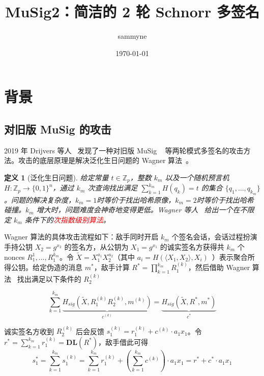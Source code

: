 \documentclass[a4paper,10pt]{article}
\title{MuSig2：简洁的 2 轮 Schnorr 多签名}
\author{sammyne}
\date{\today}
\newcommand{\bZ}{\mathbb{Z}}
\newtheorem{definition}{\bf 定义}[section]
\begin{document}
\maketitle

\section{背景}

\subsection{对旧版 MuSig 的攻击}
2019 年 Drijvers 等人~\cite{2019On} 发现了一种对旧版 MuSig ~\cite{cryptoeprint:2018:068:20180118:124757} 等两轮模式多签名的攻击方法。攻击的底层原理是解决泛化生日问题的 Wagner 算法~\cite{wagner2002generalized}。

\begin{definition}[泛化生日问题]
  给定常量 \(t\in \bZ_p\)，整数 \(k_m\) 以及一个随机预言机 \(H: \bZ_p\rightarrow \{0,1\}^n\)，通过 \(k_m\) 次查询找出满足 \(\sum_{k=1}^{k_m}H(q_k)=t\) 的集合 \(\{q_1,\dots,q_{k_m}\}\)。问题的解决复杂度，\(k_m=1\)时等价于找出哈希原像，\(k_m=2\)时等价于找出哈希碰撞。\(k_m\) 增大时，问题难度会神奇地变得更低。Wagner 等人~\cite{wagner2002generalized} 给出一个在不限定 \(k_m\) 条件下的\textcolor{red}{次指数级别算法}。
\end{definition}

Wagner 算法的具体攻击流程如下：敌手同时开启 \(k_m\) 个签名会话，会话过程扮演手持公钥 \(X_2=g^{x_2}\) 的签名方，从公钥为 \(X_1=g^{x_1}\) 的诚实签名方获得共 \(k_m\) 个 nonces \(R_1^1,\dots,R_1^{k_m}\)。令 \(\tilde{X}=X_1^{a_1}X_2^{a_2}\)（其中 \(a_i=H(\langle X_1,X_2\rangle,X_i)\)~\cite{cryptoeprint:2018:068:20180118:124757}）表示聚合所得公钥。给定伪造的消息 \(m^*\)，敌手计算 \(R^*=\prod_{k=1}^{k_m} R_1^{(k)}\)，然后借助 Wagner 算法~\cite{wagner2002generalized} 找出满足以下条件的 \(R_2^{(k)}\)

\begin{equation}\label{fake-R2}
  \sum_{k=1}^{k_m} \underbrace{H_{sig}(\tilde{X},R_1^{(k)} R_2^{(k)},m^{(k)})}_{c^{(k)}} = \underbrace{H_{sig}(\tilde{X},R^*,m^*)}_{c^*}
\end{equation}

诚实签名方收到 \(R_2^{(k)}\) 后会反馈 \(s_1^{(k)}=r_1^{(k)}+c^{(k)}\cdot a_1x_1\)。令 \(r^*=\sum_{k=1}^{k_m}r_1^{(k)} = \mathbf{DL}(R^*)\)，敌手借此可得
\[
  s_1^* = \sum_{k=1}^{k_m} s_1^{(k)} = \sum_{k=1}^{k_m} r_1^{(k)} + \left(\sum_{k=1}^{k_m} c^{(k)}\right)\cdot a_1x_1 = r^*+c^*\cdot a_1x_1
\]
\end{document}
